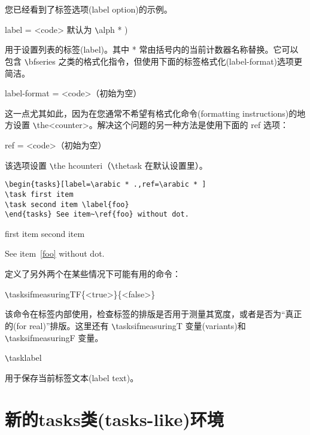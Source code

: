 \documentclass[a4paper,12pt,indent]{article}
\begin{document}
您已经看到了标签选项(label option)的示例。

label = {<code>} \hfill 默认为 \verb|\|\textcolor{Tasks}{alph *} )

用于设置列表的标签(label)。其中 * 常由括号内的当前计数器名称替换。它可以包含 \verb|\|\textcolor{Tasks}{bfseries} 之类的格式化指令，但使用下面的标签格式化(label-format)选项更简洁。

label-format = {<code>}\hfill （初始为空）

这一点尤其如此，因为在您通常不希望有格式化命令(formatting instructions)的地方设置 \verb|\|\textcolor{Tasks}{the<counter>}。解决这个问题的另一种方法是使用下面的 ref 选项：

ref = {<code>}\hfill （初始为空）

该选项设置 \verb|\|\textcolor{Tasks}{the hcounteri}（\verb|\|\textcolor{Tasks}{thetask} 在默认设置里）。

\begin{tcolorbox}[collower=black,colframe=Tasks,colback=white]
    \begin{lstlisting}
\begin{tasks}[label=\arabic * .,ref=\arabic * ]
\task first item
\task second item \label{foo}
\end{tasks} See item~\ref{foo} without dot.
\end{lstlisting}
        \tcblower
        \begin{tasks}[
            ]
            \task first item
            \task second item \label{foo}
            \end{tasks}
            See item~\ref{foo} without dot.
           \end{tcolorbox}

定义了另外两个在某些情况下可能有用的命令：

\verb|\|\textcolor{Tasks}{tasksifmeasuringTF\{<true>\}\{<false>\}}

该命令在标签内部使用，检查标签的排版是否用于测量其宽度，或者是否为“真正的(for real)”排版。这里还有 \verb|\|\textcolor{Tasks}{tasksifmeasuringT} 变量(variants)和 \verb|\|\textcolor{Tasks}{tasksifmeasuringF} 变量。

\verb|\|\textcolor{Tasks}{tasklabel}

用于保存当前标签文本(label text)。

\section{新的tasks类(tasks-like)环境}
\end{document}

